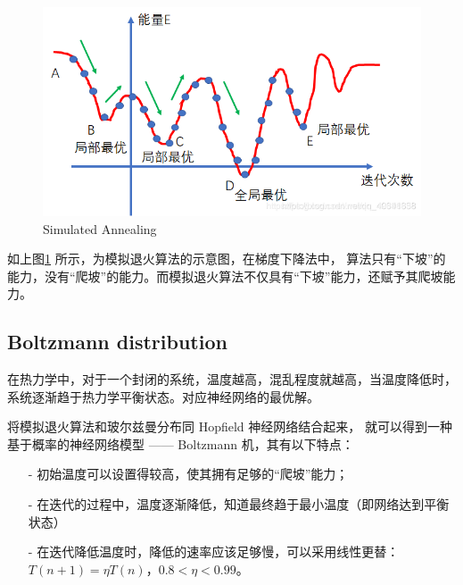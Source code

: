 \begin{figure}[H]
\centering
\includegraphics[scale=0.382]{pix/Boltzmann/simulated_annealing.png}
\caption{Simulated Annealing}
\label{fig:simulated_annealing}
\end{figure}

如上图\ref{fig:simulated_annealing} 所示，为模拟退火算法的示意图，在梯度下降法中，
算法只有“下坡”的能力，没有“爬坡”的能力。而模拟退火算法不仅具有“下坡”能力，还赋予其爬坡能力。


\subsection{Boltzmann distribution}

在热力学中，对于一个封闭的系统，温度越高，混乱程度就越高，当温度降低时，
系统逐渐趋于热力学平衡状态。对应神经网络的最优解。

将模拟退火算法和玻尔兹曼分布同 Hopfield 神经网络结合起来，
就可以得到一种基于概率的神经网络模型 —— Boltzmann 机，其有以下特点：

\begin{itemize}
\setlength{\parskip}{0pt}
\item[-]
初始温度可以设置得较高，使其拥有足够的“爬坡”能力；

\item[-]
在迭代的过程中，温度逐渐降低，知道最终趋于最小温度（即网络达到平衡状态）

\item[-]
在迭代降低温度时，降低的速率应该足够慢，可以采用线性更替：$T(n+1)=\eta T(n)$，$0.8<\eta<0.99$。
\end{itemize}

